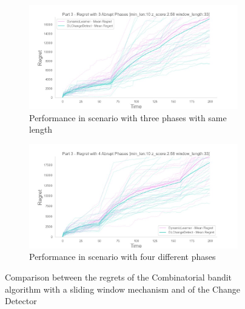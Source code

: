 \begin{figure}[!htb]
	\centering
	
	\begin{subfigure}[!H]{0.8\textwidth}
		\centering
		\includegraphics[width=\textwidth]{images/ThreeSamePhase.jpeg}
		\caption{Performance in scenario with three phases with same length}
		\label{comparisonPlot1}
	\end{subfigure}
	\begin{subfigure}[!H]{0.8\textwidth}
		\centering
		\includegraphics[width=\textwidth]{images/FourAbrupt.jpeg}
		\caption{Performance in scenario with four different phases}
		\label{comparisonPlot2}
	\end{subfigure}
	
	\caption{Comparison between the regrets of the Combinatorial bandit algorithm with a sliding window mechanism and of the Change Detector}
\end{figure}
